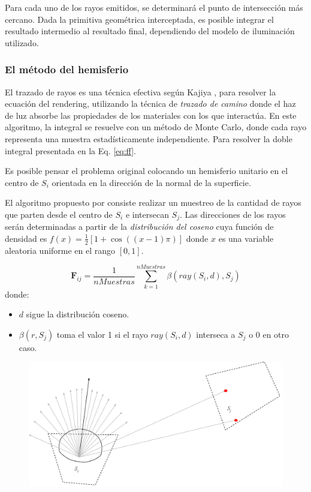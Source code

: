 Para cada uno de los rayos emitidos, se determinará el punto de intersección más cercano. Dada la primitiva geométrica interceptada, es posible integrar el resultado intermedio al resultado final, dependiendo del modelo de iluminación utilizado.

\subsubsection{El método del hemisferio}

El trazado de rayos es una técnica efectiva según Kajiya \cite{Kajiya}, para resolver la ecuación del rendering, utilizando la técnica de \textit{trazado de camino} donde el haz de luz absorbe las propiedades de los materiales con los que interactúa. En este algoritmo, la integral se resuelve con un método de Monte Carlo, donde cada rayo representa una muestra estadísticamente independiente. Para resolver la doble integral presentada en la Eq. \eqref{eq:ff}.

Es posible pensar el problema original colocando un hemisferio unitario en el centro de $S_{i}$ orientada en la dirección de la normal de la superficie.

El algoritmo propuesto por \citeauthor{Malley} \cite{Malley} consiste realizar un muestreo de la cantidad de  rayos que parten desde el centro de $S_{i}$ e intersecan $S_{j}$. Las direcciones de los rayos serán determinadas a partir de la \textit{distribución del coseno} cuya función de densidad es $f(x) = \frac{1}{2}[1 + \cos((x-1)\pi)]$ donde $x$ es una variable aleatoria uniforme en el rango $[0,1]$.

\begin{equation}
	\mathbf{F}_{ij} = \frac{1}{nMuestras} \sum_{k=1}^{nMuestras} {\beta(ray(S_{i},d), S_{j})}
	\label{eq:ffhemiesfera}
\end{equation}
donde: \begin{itemize}
		\item  $d$ sigue la distribución coseno.
		\item $\beta(r, S_{j})$ toma el valor 1 si el rayo $ray(S_{i},d)$ interseca a $S_{j}$ o $0$ en otro caso.
	   \end{itemize}
\clearpage

\vspace{5mm}
\begin{figure}[htbp]
	\centering
	\includegraphics[width=\linewidth]{assets/Raytracing}
	\label{img:ff}
\end{figure}


